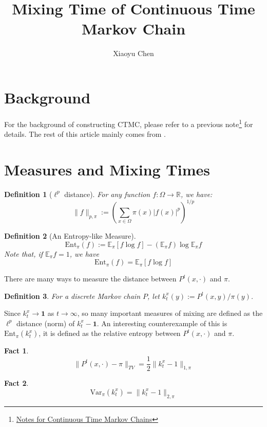 \documentclass{article}
\title{Mixing Time of Continuous Time Markov Chain}
\author{Xiaoyu Chen}
\date{}
\newtheorem{define}{Definition}[section]
\newtheorem{fact}{Fact}[section]
\begin{document}
\maketitle
\section{Background}
For the background of constructing CTMC, please refer to a previous note\footnote{\href{file://../CTMC(countinuous-time-MC)/note.pdf}{Notes for Continuous Time Markov Chains}} for details.
The rest of this article mainly comes from \cite{montenegro2006mathematical}.

\section{Measures and Mixing Times}

\begin{define}[$\ell^p$ distance]
  For any function $f:\Omega \to \mathbb{R}$, we have:
  \[\parallel f \parallel_{p, \pi} := \left(\sum_{x\in\Omega}\pi(x) |f(x)|^p\right)^{1/p}\]
\end{define}

\begin{define}[An Entropy-like Measure]
  \[\mathrm{Ent}_\pi(f) := \mathbb{E}_\pi[f \log f] - (\mathbb{E}_\pi f) \log \mathbb{E}_\pi f\]
  Note that, if $\mathbb{E}_\pi f = 1$, we have
  \[\mathrm{Ent}_\pi(f) = \mathbb{E}_\pi[f \log f]\]
\end{define}

There are many ways to measure the distance between $P^t(x, \cdot)$ and $\pi$.

\begin{define}
  For a discrete Markov chain $P$, let $k^x_t(y) := P^t(x,y)/\pi(y)$.
\end{define}

Since $k^x_t \to \mathbf{1}$ as $t \to \infty$, so many important measures of mixing are defined as the $\ell^p$ distance (norm) of $k^x_t - \mathbf{1}$.
An interesting counterexample of this is $\mathrm{Ent}_\pi(k^x_t)$, it is defined as the relative entropy between $P^t(x, \cdot)$ and $\pi$.

\begin{fact}
  \[\parallel P^t(x, \cdot) - \pi \parallel_{TV} = \frac{1}{2}\parallel k^x_t - 1 \parallel_{1,\pi}\]
\end{fact}

\begin{fact}
  \[\mathrm{Var}_\pi(k^x_t) = \parallel k^x_t - 1 \parallel_{2, \pi}\]
\end{fact}
\end{document}

